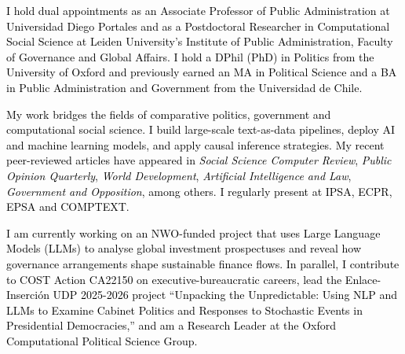 




\vspace{3mm}

\begin{cvparagraph}

\textcolor{black}{I hold dual appointments as an Associate Professor of Public Administration at Universidad Diego Portales and as a Postdoctoral Researcher in Computational Social Science at Leiden University’s Institute of Public Administration, Faculty of Governance and Global Affairs. I hold a DPhil (PhD) in Politics from the University of Oxford and previously earned an MA in Political Science and a BA in Public Administration and Government from the Universidad de Chile.}

\textcolor{black}{My work bridges the fields of comparative politics, government and computational social science. I build large-scale text-as-data pipelines, deploy AI and machine learning models, and apply causal inference strategies. My recent peer-reviewed articles have appeared in {\itshape Social Science Computer Review}, {\itshape Public Opinion Quarterly}, {\itshape World Development}, {\itshape Artificial Intelligence and Law}, {\itshape Government and Opposition}, among others. I regularly present at IPSA, ECPR, EPSA and COMPTEXT.}

\textcolor{black}{I am currently working on an NWO-funded project that uses Large Language Models (LLMs) to analyse global investment prospectuses and reveal how governance arrangements shape sustainable finance flows. In parallel, I contribute to COST Action CA22150 on executive-bureaucratic careers, lead the Enlace-Inserción UDP 2025-2026 project “Unpacking the Unpredictable: Using NLP and LLMs to Examine Cabinet Politics and Responses to Stochastic Events in Presidential Democracies,” and am a Research Leader at the Oxford Computational Political Science Group.}
\vspace{1mm}
\end{cvparagraph}

